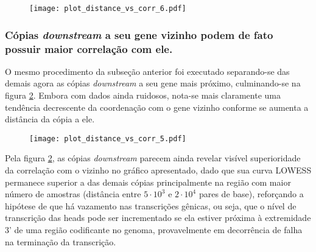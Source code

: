 \documentclass[12pt]{article}
\begin{document}
\begin{multicols}{2}
\begin{figure}[H]
	\centering
	\label{completude}
	\texttt{[image: plot\_distance\_vs\_corr\_6.pdf]}
\end{figure}

% 


\subsubsection{Cópias \textit{downstream} a seu gene vizinho podem de fato possuir maior correlação com ele.}
O mesmo procedimento da subseção anterior foi executado separando-se das demais agora as cópias \textit{downstream} a seu gene mais próximo, culminando-se na figura \ref{updownstream}. Embora com dados ainda ruidosos, nota-se mais claramente uma tendência decrescente da coordenação com o gene vizinho conforme se aumenta a distância da cópia a ele.

\begin{figure}[H]
	\centering
	\label{updownstream}
	\texttt{[image: plot\_distance\_vs\_corr\_5.pdf]}
\end{figure}

Pela figura \ref{updownstream}, as cópias \textit{downstream} parecem ainda revelar visível superioridade da correlação com o vizinho no gráfico apresentado, dado que sua curva LOWESS permanece superior a das demais cópias principalmente na região com maior número de amostras (distância entre \(5\cdot 10^3\) e \(2 \cdot 10^4\) pares de base), reforçando a hipótese de que há vazamento nas transcrições gênicas, ou seja, que o nível de transcrição das heads pode ser incrementado se ela estiver próxima à extremidade 3' de uma região codificante no genoma, provavelmente em decorrência de falha na terminação da transcrição.


\end{multicols}
\end{document}

